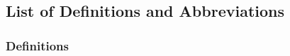 \documentclass[english]{article}
\begin{document}
%

\subsection{List of Definitions and Abbreviations}

\subsubsection{Definitions}
\end{document}
